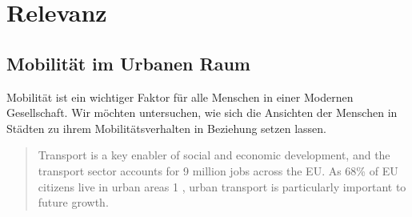 \section{Relevanz}
\subsection{Mobilität im Urbanen Raum} %
	
	Mobilität ist ein wichtiger Faktor für alle Menschen in einer Modernen Gesellschaft.
	Wir möchten untersuchen, wie sich die Ansichten der Menschen in Städten zu ihrem Mobilitätsverhalten in Beziehung setzen lassen.

\begin{quote}
	Transport is a key enabler of social and economic development, and the transport sector
accounts for 9 million jobs across the EU. As 68\% of EU citizens live in urban areas 1 ,
urban transport is particularly important to future growth.
\emph{\parencite[2]{ebs406en}}
\end{quote}

